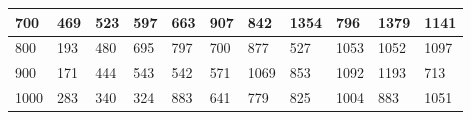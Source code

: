 \documentclass[10pt,letterpaper]{article}
\begin{document}
\begin{center}
\begin{table}
\begin{tabular} { |m{0.5cm}|m{1.3cm}|m{1.3cm}|m{1.3cm}|m{1.3cm}|m{1.3cm}|m{1.3cm}|m{1.3cm}|m{1.3cm}|m{1.3cm}|m{1.3cm}|}
\hline
\cellcolor{Gray}700 & \Large 469 & \Large 523 & \Large 597 & \Large 663 & \Large 907 & \Large 842 & \Large 1354 & \Large 796 & \Large 1379 & \Large 1141 \\
\hline
\cellcolor{Gray}800 & \Large 193 & \Large 480 & \Large 695 & \Large 797 & \Large 700 & \Large 877 & \Large 527 & \Large 1053 & \Large 1052 & \Large 1097 \\
\hline
\cellcolor{Gray}900 & \Large 171 & \Large 444 & \Large 543 & \Large 542 & \Large 571 & \Large 1069 & \Large 853 & \Large 1092 & \Large 1193 & \Large 713 \\
\hline
\cellcolor{Gray}1000 & \Large 283 & \Large 340 & \Large 324 & \Large 883 & \Large 641 & \Large 779 & \Large 825 & \Large 1004 & \Large 883 & \Large 1051 \\
\hline
\end{tabular} \\
\end{table}
\end{center}
\newpage 
{}
\end{document}
